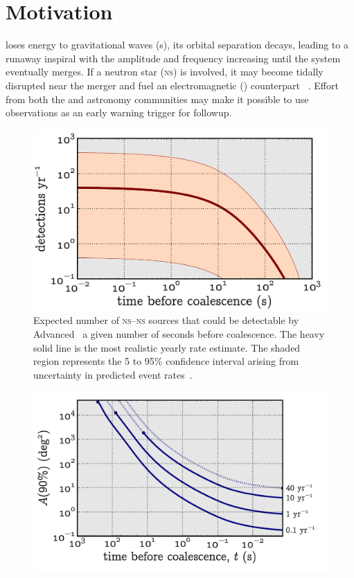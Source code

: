 \documentclass[portrait,plainboxedsections]{sciposter}
\begin{document}
\begin{minipage}[t]{0.25\textwidth}

\section*{Motivation}
 loses energy to gravitational waves (\GW{}s), its
orbital separation decays, leading to a runaway inspiral with the \GW{}
amplitude and frequency increasing until the system eventually merges.  If a
neutron star (\textsc{ns}) is involved, it may become tidally disrupted near
the merger and fuel an electromagnetic (\EM{}) counterpart~%
\cite{shibata:2007}.  Effort from both the \GW{} and astronomy communities may make it
possible to use \GW{} observations as an early warning trigger for \EM{}
followup.
%
\begin{figure}[h]
\includegraphics[width=\textwidth]{figures/snr_in_time}
\caption{\label{fig:earlywarning}Expected number of \textsc{ns}--\textsc{ns}
sources that could be detectable by Advanced \LIGO\ a given number of seconds
before coalescence.  The heavy solid line is the most realistic yearly rate
estimate.  The shaded region represents the 5 to 95\% confidence interval
arising from uncertainty in predicted event rates~\cite{Abadie:2010p10836}.}
\end{figure}
%
\begin{figure}[h]
\includegraphics[width=\textwidth]{figures/loc_in_time}

\end{figure}
\end{minipage}
\end{document}
